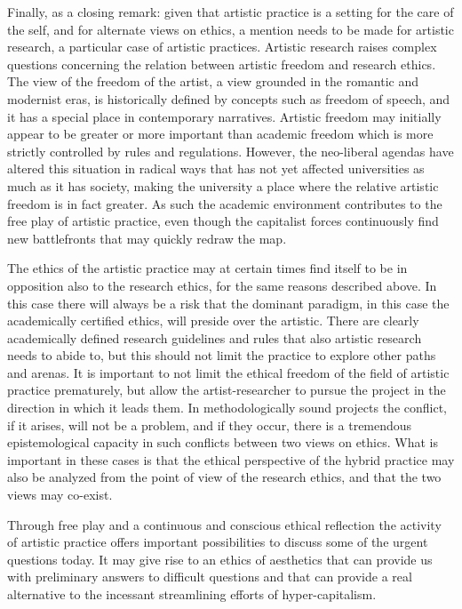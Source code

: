 \documentclass[11pt]{article}
\begin{document}
Finally, as a closing remark: given that artistic practice is a setting for the care of the self, and for alternate views on ethics, a mention needs to be made for artistic research, a particular case of artistic practices. Artistic research raises complex questions concerning the relation between artistic freedom and research ethics. The view of the freedom of the artist, a view grounded in the romantic and modernist eras, is historically defined by concepts such as freedom of speech, and it has a special place in contemporary narratives. Artistic freedom may initially appear to be greater or more important than academic freedom which is more strictly controlled by rules and regulations. However, the neo-liberal agendas have altered this situation in radical ways that has not yet affected universities as much as it has society, making the university a place where the relative artistic freedom is in fact greater. As such the academic environment contributes to the free play of artistic practice, even though the capitalist forces continuously find new battlefronts that may quickly redraw the map.

The ethics of the artistic practice may at certain times find itself to be in opposition also to the research ethics, for the same reasons described above. In this case there will always be a risk that the dominant paradigm, in this case the academically certified ethics, will preside over the artistic. There are clearly academically defined research guidelines and rules that also artistic research needs to abide to, but this should not limit the practice to explore other paths and arenas. It is important to not limit the ethical freedom of the field of artistic practice prematurely, but allow the artist-researcher to pursue the project in the direction in which it leads them. In methodologically sound projects the conflict, if it arises, will not be a problem, and if they occur, there is a tremendous epistemological capacity in such conflicts between two views on ethics. What is important in these cases is that the ethical perspective of the hybrid practice may also be analyzed from the point of view of the research ethics, and that the two views may co-exist.

Through free play and a continuous and conscious ethical reflection the activity of artistic practice offers important possibilities to discuss some of the urgent questions today. It may give rise to an ethics of aesthetics that can provide us with preliminary answers to difficult questions and that can provide a real alternative to the incessant streamlining efforts of hyper-capitalism.
\end{document}
